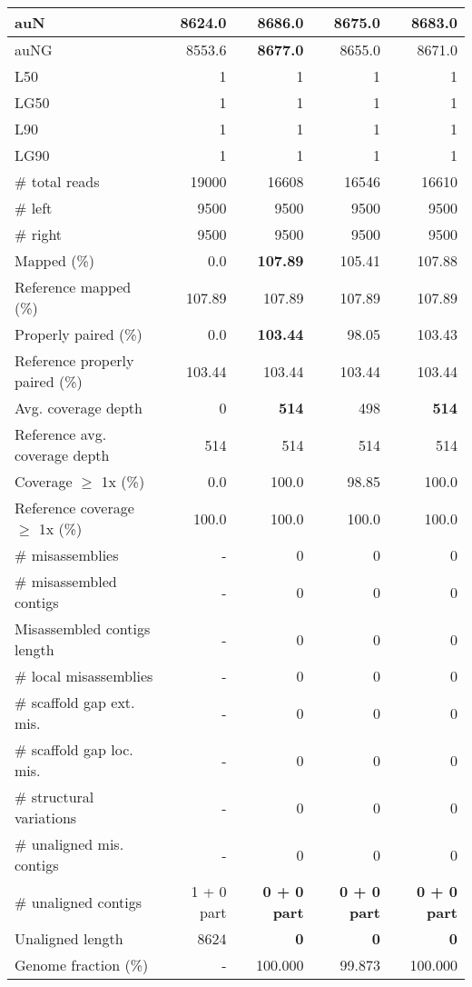 \documentclass[12pt,a4paper]{article}
\begin{document}
\begin{table}[ht]
\begin{center}
\begin{tabular}{|l*{4}{|r}|}
auN & 8624.0 & {\bf 8686.0} & 8675.0 & 8683.0 \\ \hline
auNG & 8553.6 & {\bf 8677.0} & 8655.0 & 8671.0 \\ \hline
L50 & 1 & 1 & 1 & 1 \\ \hline
LG50 & 1 & 1 & 1 & 1 \\ \hline
L90 & 1 & 1 & 1 & 1 \\ \hline
LG90 & 1 & 1 & 1 & 1 \\ \hline
\# total reads & 19000 & 16608 & 16546 & 16610 \\ \hline
\# left & 9500 & 9500 & 9500 & 9500 \\ \hline
\# right & 9500 & 9500 & 9500 & 9500 \\ \hline
Mapped (\%) & 0.0 & {\bf 107.89} & 105.41 & 107.88 \\ \hline
Reference mapped (\%) & 107.89 & 107.89 & 107.89 & 107.89 \\ \hline
Properly paired (\%) & 0.0 & {\bf 103.44} & 98.05 & 103.43 \\ \hline
Reference properly paired (\%) & 103.44 & 103.44 & 103.44 & 103.44 \\ \hline
Avg. coverage depth & 0 & {\bf 514} & 498 & {\bf 514} \\ \hline
Reference avg. coverage depth & 514 & 514 & 514 & 514 \\ \hline
Coverage $\geq$ 1x (\%) & 0.0 & 100.0 & 98.85 & 100.0 \\ \hline
Reference coverage $\geq$ 1x (\%) & 100.0 & 100.0 & 100.0 & 100.0 \\ \hline
\# misassemblies & - & 0 & 0 & 0 \\ \hline
\# misassembled contigs & - & 0 & 0 & 0 \\ \hline
Misassembled contigs length & - & 0 & 0 & 0 \\ \hline
\# local misassemblies & - & 0 & 0 & 0 \\ \hline
\# scaffold gap ext. mis. & - & 0 & 0 & 0 \\ \hline
\# scaffold gap loc. mis. & - & 0 & 0 & 0 \\ \hline
\# structural variations & - & 0 & 0 & 0 \\ \hline
\# unaligned mis. contigs & - & 0 & 0 & 0 \\ \hline
\# unaligned contigs & 1 + 0 part & {\bf 0 + 0 part} & {\bf 0 + 0 part} & {\bf 0 + 0 part} \\ \hline
Unaligned length & 8624 & {\bf 0} & {\bf 0} & {\bf 0} \\ \hline
Genome fraction (\%) & - & 100.000 & 99.873 & 100.000 \\ \hline

\end{tabular}
\end{center}
\end{table}
\end{document}
